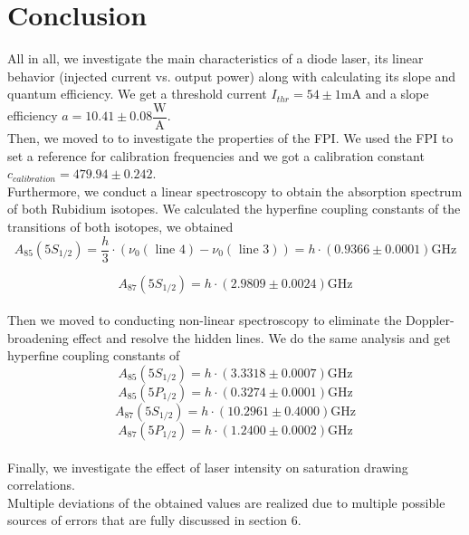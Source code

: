 \documentclass[12pt]{article}
\begin{document}
\section{Conclusion}
All in all, we investigate the main characteristics of a diode laser, its linear behavior (injected current vs. output power) along with calculating its slope and quantum efficiency. We get a threshold current $I_{thr} = 54 \pm 1 \mathrm{mA}$ and a slope efficiency $a= 10.41 \pm 0.08 \mathrm{\dfrac{W}{A}}$. \\
Then, we moved to to investigate the properties of the FPI. We used the FPI to set a reference for calibration frequencies and we got a calibration constant $c_{calibration} = 479.94 \pm 0.242$. \\

Furthermore, we conduct a linear spectroscopy to obtain the absorption spectrum of both Rubidium isotopes. We calculated the hyperfine coupling constants of the transitions of both isotopes, we obtained 
\begin{equation*}
    A_{85}\left(5 S_{1 / 2}\right)=\frac{h}{3} \cdot\left(\nu_0(\text { line } 4)-\nu_0(\text { line } 3)\right)=h \cdot(0.9366 \pm 0.0001) \mathrm{GHz}
\end{equation*}

\begin{equation*}
    A_{87}\left(5 S_{1 / 2}\right)=h \cdot(2.9809 \pm 0.0024) \mathrm{GHz}
\end{equation*}
\\
Then we moved to conducting non-linear spectroscopy to eliminate the Doppler-broadening effect and resolve the hidden lines. We do the same analysis and get hyperfine coupling constants of 
\begin{equation*}
    A_{85}\left(5 S_{1 / 2}\right)=h \cdot(3.3318 \pm 0.0007) \mathrm{GHz}
\end{equation*}
\begin{equation*}
    A_{85}\left(5 P_{1 / 2}\right)=h \cdot(0.3274 \pm 0.0001) \mathrm{GHz}
\end{equation*} 
\begin{equation*}
 A_{87}\left(5 S_{1 / 2}\right)=h \cdot(10.2961 \pm 0.4000) \mathrm{GHz}   
\end{equation*}
\begin{equation*}
 A_{87}\left(5 P_{1 / 2}\right)=h \cdot(1.2400 \pm 0.0002) \mathrm{GHz}    
\end{equation*}
 \\ 
Finally, we investigate the effect of laser intensity on saturation drawing correlations. \\
Multiple deviations of the obtained values are realized due to multiple possible sources of errors that are fully discussed in section 6.
\printbibliography
\end{document}
